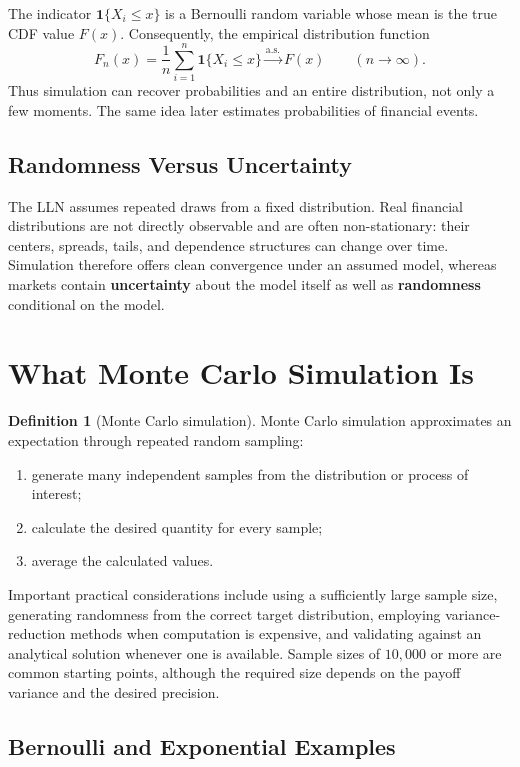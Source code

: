\documentclass[12pt,openany]{book}
\theoremstyle{definition}
\newtheorem{definition}[theorem]{Definition}
\theoremstyle{remark}
\newcommand{\ii}{\mathbf{1}}
\begin{document}
The indicator \(\ii\{X_i\leq x\}\) is a Bernoulli random variable whose mean
is the true CDF value \(F(x)\). Consequently, the empirical distribution
function
\[
F_n(x)
=\frac1n\sum_{i=1}^{n}\ii\{X_i\leq x\}
\xrightarrow{\text{a.s.}}F(x)
\qquad(n\to\infty).
\]
Thus simulation can recover probabilities and an entire distribution, not
only a few moments. The same idea later estimates probabilities of financial
events.

\subsection{Randomness Versus Uncertainty}

The LLN assumes repeated draws from a fixed distribution. Real financial
distributions are not directly observable and are often non-stationary:
their centers, spreads, tails, and dependence structures can change over
time. Simulation therefore offers clean convergence under an assumed model,
whereas markets contain \textbf{uncertainty} about the model itself as well
as \textbf{randomness} conditional on the model.

\section{What Monte Carlo Simulation Is}

\begin{definition}[Monte Carlo simulation]
Monte Carlo simulation approximates an expectation through repeated random
sampling:
\begin{enumerate}
    \item generate many independent samples from the distribution or process
    of interest;
    \item calculate the desired quantity for every sample;
    \item average the calculated values.
\end{enumerate}
\end{definition}

Important practical considerations include using a sufficiently large sample
size, generating randomness from the correct target distribution, employing
variance-reduction methods when computation is expensive, and validating
against an analytical solution whenever one is available. Sample sizes of
\(10{,}000\) or more are common starting points, although the required size
depends on the payoff variance and the desired precision.

\subsection{Bernoulli and Exponential Examples}
\end{document}
